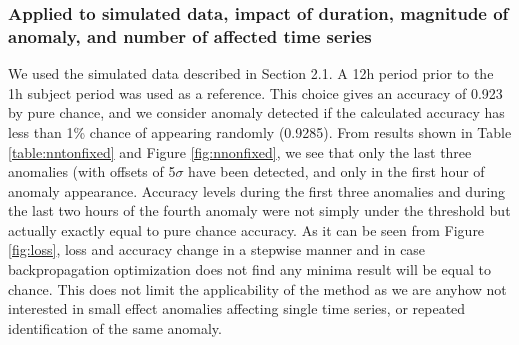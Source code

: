\documentclass[5p]{elsarticle}
\begin{document}
\subsubsection{Applied to simulated data, impact of duration, magnitude of anomaly, and number of affected time series}
We used the simulated data described in Section 2.1. A 12h period prior to the 1h subject period was used as a reference. This choice gives an accuracy of 0.923 by pure chance, and we consider anomaly detected if the calculated accuracy has less than 1\% chance of appearing randomly (0.9285). From results shown in Table \ref{table:nntonfixed} and Figure \ref{fig:nnonfixed}, we see that only the last three anomalies (with offsets of 5$\sigma$ have been detected, and only in the first hour of anomaly appearance. Accuracy levels during the first three anomalies and during the last two hours of the fourth anomaly were not simply under the threshold but actually exactly equal to pure chance accuracy. As it can be seen from Figure \ref{fig:loss}, loss and accuracy change in a stepwise manner and in case backpropagation optimization does not find any minima result will be equal to chance. This does not limit the applicability of the method as we are anyhow not interested in small effect anomalies affecting single time series, or repeated identification of the same anomaly. 
\end{document}
